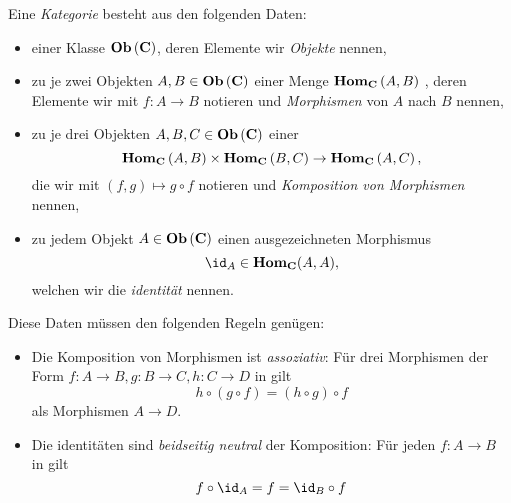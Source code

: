 \documentclass{article}
\begin{document}
		Eine \emph{Kategorie} \CatC besteht aus den folgenden Daten:
		\begin{itemize}
			\item einer Klasse \(  \mathbf{Ob}  \left( \mathbf{C} \right) \), deren Elemente wir \emph{Objekte} nennen,
			\item zu je zwei Objekten 
			\begin{math}
				A,B \in  \mathbf{Ob}  \left( \mathbf{C}  \right) 
			\end{math}
			einer Menge 
			\begin{math}
				 \mathbf{Hom } _\mathbf{C} \left( A,B \right) 
			\end{math}
			, deren Elemente wir mit 
			\begin{math}
				f : A \to B 
			\end{math}
			notieren und \emph{Morphismen} von $ A $ nach $ B $ nennen,
			\item zu je drei Objekten 
			\begin{math}
		 A,B,C \in  \mathbf{Ob}  \left( \mathbf{C}  \right) 
			\end{math}	
			einer \Abb 
			\begin{displaymath}
				 \mathbf{Hom } _\mathbf{C} \left( A,B \right) \times  \mathbf{Hom } _\mathbf{C} \left( B,C \right) \to  \mathbf{Hom } _\mathbf{C} \left( A,C \right) ,
			\end{displaymath}
			die wir mit 
			\begin{math}
				\left( f,g \right) \mapsto g \circ f
			\end{math}
			notieren und \emph{Komposition von Morphismen} nennen, 
		\item zu jedem Objekt 
			\begin{math}
				A \in  \mathbf{Ob}  \left( \mathbf{C} \right)
			\end{math} 	
			einen ausgezeichneten Morphismus 
			\begin{displaymath}
				\id_A \in \Hom_\CatC ( A,A) ,
			\end{displaymath}
			welchen wir die \emph{identit\"at} nennen.
		\end{itemize}
		Diese Daten m\"ussen den folgenden Regeln gen\"ugen:
		\begin{itemize}
			\item Die Komposition von Morphismen ist \emph{assoziativ}: F\"ur drei Morphismen der Form
			\begin{math}
				f: A \to B , g: B \to C, h:C \to D 
			\end{math}
			in \CatC gilt 
			\begin{displaymath}
				h \circ \left( g \circ f \right) = \left( h \circ g \right) \circ f
			\end{displaymath}
			als Morphismen
			\begin{math}
				A \to D.
			\end{math}
			\item Die identit\"aten sind \emph{beidseitig neutral} \bzgl der Komposition: F\"ur jeden \Mor 
			\begin{math}
				f: A \to B
			\end{math}
			in \CatC gilt
			\begin{displaymath}
				f \circ \id_A = f = \id_B \circ f
			\end{displaymath}
		\end{itemize}
\end{document}
